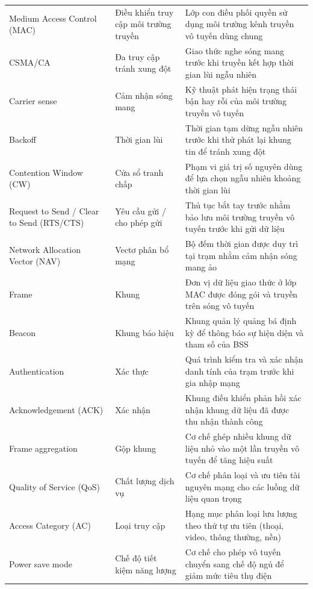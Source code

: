 \begin{xltabular}{\linewidth}{@{} L{0.8} L{0.8} L{1.4} @{}}
  Medium Access Control (MAC) & Điều khiển truy cập môi trường truyền & Lớp con điều phối quyền sử dụng môi trường kênh truyền vô tuyến dùng chung\\
  CSMA/CA & Đa truy cập tránh xung đột & Giao thức nghe sóng mang trước khi truyền kết hợp thời gian lùi ngẫu nhiên\\
  Carrier sense & Cảm nhận sóng mang & Kỹ thuật phát hiện trạng thái bận hay rỗi của môi trường truyền vô tuyến\\
  Backoff & Thời gian lùi & Thời gian tạm dừng ngẫu nhiên trước khi thử phát lại khung tin để tránh xung đột\\
  Contention Window (CW) & Cửa sổ tranh chấp & Phạm vi giá trị số nguyên dùng để lựa chọn ngẫu nhiên khoảng thời gian lùi\\
  Request to Send / Clear to Send (RTS/CTS) & Yêu cầu gửi / cho phép gửi & Thủ tục bắt tay trước nhằm bảo lưu môi trường truyền vô tuyến trước khi gửi dữ liệu\\
  Network Allocation Vector (NAV) & Vectơ phân bổ mạng & Bộ đếm thời gian được duy trì tại trạm nhằm cảm nhận sóng mang ảo\\
  Frame & Khung & Đơn vị dữ liệu giao thức ở lớp MAC được đóng gói và truyền trên sóng vô tuyến\\
  Beacon & Khung báo hiệu & Khung quản lý quảng bá định kỳ để thông báo sự hiện diện và tham số của BSS\\
  Authentication & Xác thực & Quá trình kiểm tra và xác nhận danh tính của trạm trước khi gia nhập mạng\\
  Acknowledgement (ACK) & Xác nhận & Khung điều khiển phản hồi xác nhận khung dữ liệu đã được thu nhận thành công\\
  Frame aggregation & Gộp khung & Cơ chế ghép nhiều khung dữ liệu nhỏ vào một lần truyền vô tuyến để tăng hiệu suất\\
  Quality of Service (QoS) & Chất lượng dịch vụ & Cơ chế phân loại và ưu tiên tài nguyên mạng cho các luồng dữ liệu quan trọng\\
  Access Category (AC) & Loại truy cập & Hạng mục phân loại lưu lượng theo thứ tự ưu tiên (thoại, video, thông thường, nền)\\
  Power save mode & Chế độ tiết kiệm năng lượng & Cơ chế cho phép vô tuyến chuyển sang chế độ ngủ để giảm mức tiêu thụ điện\\


\end{xltabular}
